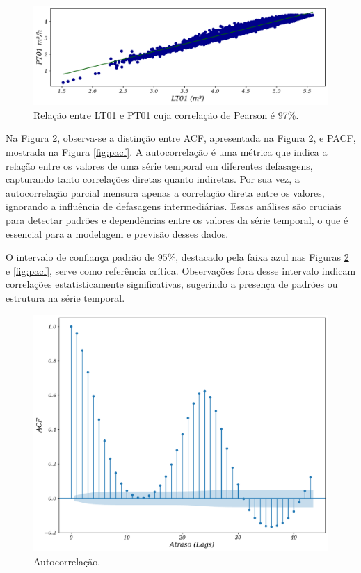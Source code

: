 \begin{figure}[!htb]
	\centering
	\caption{Relação entre LT01 e PT01 cuja correlação de Pearson é 97\%.}
	\label{fig:lr-lt01-m3}
	\includegraphics[width=0.7\linewidth]{Resultados/Figuras/LR}
\end{figure}


Na Figura \ref{fig:acfa}, observa-se a distinção entre ACF, apresentada na Figura \ref{fig:acfa}, e PACF, mostrada na Figura \ref{fig:pacf}. A autocorrelação é uma métrica que indica a relação entre os valores de uma série temporal em diferentes defasagens, capturando tanto correlações diretas quanto indiretas. Por sua vez, a autocorrelação parcial mensura apenas a correlação direta entre os valores, ignorando a influência de defasagens intermediárias. Essas análises são cruciais para detectar padrões e dependências entre os valores da série temporal, o que é essencial para a modelagem e previsão desses dados.

O intervalo de confiança padrão de $95\%$, destacado pela faixa azul nas Figuras \ref{fig:acfa} e \ref{fig:pacf}, serve como referência crítica. Observações fora desse intervalo indicam correlações estatisticamente significativas, sugerindo a presença de padrões ou estrutura na série temporal.


\begin{figure}[!htb]
	\centering
	\caption{Autocorrelação.}\label{fig:acfa}	\includegraphics[width=0.6\linewidth]{Resultados/Figuras/acf} 
\end{figure}

